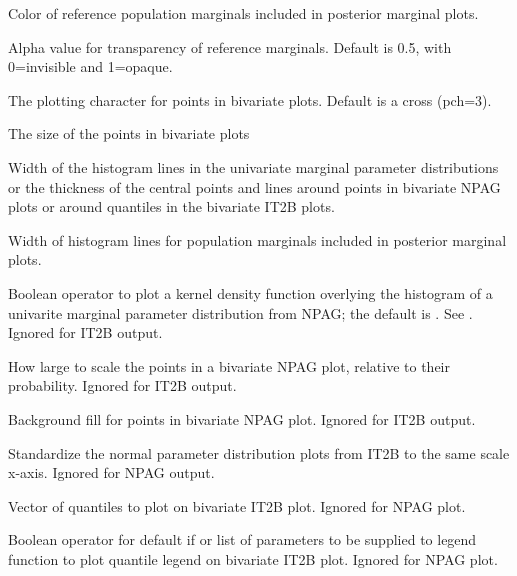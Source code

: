 \documentclass[a4paper]{book}
\begin{document}
\begin{Arguments}
\begin{ldescription}
\item[\code{col.ref}] Color of reference population marginals included in posterior marginal plots.

\item[\code{alpha.ref}] Alpha value for transparency of reference marginals. Default is 0.5, with 0=invisible and 1=opaque.

\item[\code{pch}] The plotting character for points in bivariate plots.  Default is a cross (pch=3).

\item[\code{cex}] The size of the points in bivariate plots

\item[\code{lwd}] Width of the histogram lines in the univariate marginal parameter distributions
or the thickness of the central points and lines around points in bivariate NPAG plots or around quantiles in the bivariate
IT2B plots.

\item[\code{lwd.ref}] Width of histogram lines for population marginals included in posterior marginal plots.

\item[\code{density}] Boolean operator to plot a kernel density function overlying the histogram
of a univarite marginal parameter distribution from NPAG; the default is .
See .  Ignored for IT2B output.

\item[\code{scale}] How large to scale the points in a bivariate NPAG plot, relative to their probability.
Ignored for IT2B output.

\item[\code{bg}] Background fill for points in bivariate NPAG plot.  Ignored for IT2B output.

\item[\code{standard}] Standardize the normal parameter distribution plots from IT2B to the same
scale x-axis.  Ignored for NPAG output.

\item[\code{probs}] Vector of quantiles to plot on bivariate IT2B plot.  Ignored for NPAG plot.

\item[\code{legend}] Boolean operator for default if  or list of parameters to be supplied to legend function to plot 
quantile legend on bivariate IT2B plot.  Ignored for NPAG plot.


\end{ldescription}
\end{Arguments}
\end{document}
